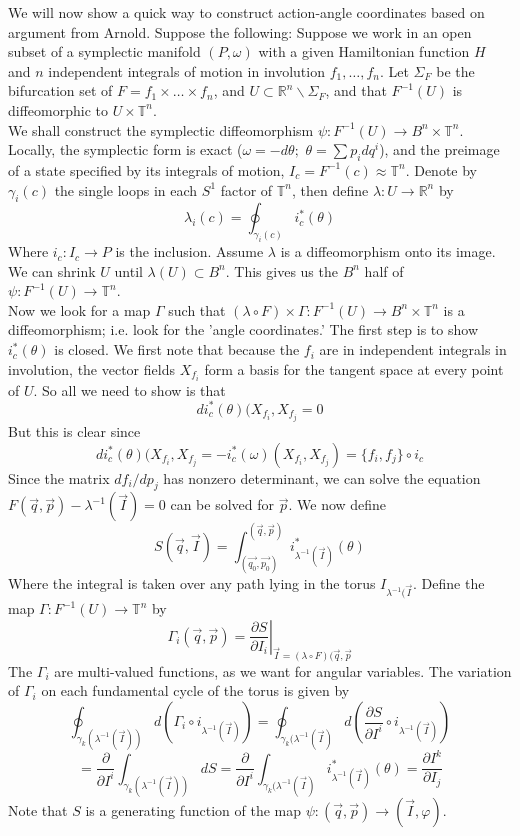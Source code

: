 \indent We will now show a quick way to construct action-angle coordinates based on argument from Arnold. Suppose the following: Suppose we work in an open subset of a symplectic manifold $(P,\omega)$ with a given Hamiltonian function $H$ and $n$ independent integrals of motion in involution $f_1, \ldots, f_n$. Let $\Sigma_F$ be the bifurcation set of $F= f_1 \times \ldots \times f_n$, and $U \subset \mathbb{R}^n \backslash \Sigma_F$, and that $F^{-1}(U)$ is diffeomorphic to $U \times \mathbb{T}^n$.\\
\indent We shall construct the symplectic diffeomorphism $\psi: F^{-1}(U) \to B^n \times \mathbb{T}^n$. Locally, the symplectic form is exact ($\omega = - d \theta; \hspace{4pt} \theta = \sum p_i dq^i$), and the preimage of a state specified by its integrals of motion, $I_c = F^{-1}(c) \approx \mathbb{T}^n$. Denote by $\gamma_i(c)$ the single loops in each $S^1$ factor of $\mathbb{T}^n$, then define $\lambda: U \to \mathbb{R}^n$ by 
\[ \lambda_i(c) = \oint_{\gamma_i(c)} i_c^*(\theta)  \]
\indent Where $i_c: I_c \to P$ is the inclusion. Assume $\lambda$ is a diffeomorphism onto its image. We can shrink $U$ until $\lambda(U) \subset B^n$. This gives us the $B^n$ half of $\psi: F^{-1}(U) \to \mathbb{T}^n$.\\
\indent Now we look for a map $\Gamma$ such that $(\lambda \circ F) \times \Gamma: F^{-1}(U) \to B^n \times \mathbb{T}^n$ is a diffeomorphism; i.e. look for the 'angle coordinates.' The first step is to show $i^*_c(\theta)$ is closed. We first note that because the $f_i$ are in independent integrals in involution, the vector fields $X_{f_i}$ form a basis for the tangent space at every point of $U$. So all we need to show is that
\[ di^*_c(\theta) (X_{f_i}, X_{f_j} =0 \]
But this is clear since
\[ di^*_c(\theta)(X_{f_i},X_{f_j} = -i^*_c(\omega)(X_{f_i},X_{f_j}) = \{f_i,f_j\}\circ i_c \]
Since the matrix $df_i/dp_j$ has nonzero determinant, we can solve the equation $F(\vec{q},\vec{p})-\lambda^{-1}(\vec{I})=0$ can be solved for $\vec{p}$. We now define
\[ S(\vec{q},\vec{I}) = \int_{(\vec{q_0},\vec{p_0})}^{(\vec{q},\vec{p})} i^*_{\lambda^{-1}(\vec{I})}(\theta)  \]
Where the integral is taken over any path lying in the torus $I_{\lambda^{-1}(\vec{I}}$. Define the map $\Gamma: F^{-1}(U) \to \mathbb{T}^n$ by 
\[ \Gamma_i(\vec{q},\vec{p}) = \left. \frac{\partial S}{\partial I_i}\right|_{\vec{I}=(\lambda \circ F)(\vec{q},\vec{p}}  \]
The $\Gamma_i$ are multi-valued functions, as we want for angular variables. The variation of $\Gamma_i$ on each fundamental cycle of the torus is given by
\[\oint_{\gamma_k(\lambda^{-1}(\vec{I}))}d(\Gamma_i \circ i_{\lambda^{-1}(\vec{I})})=\oint_{\gamma_k(\lambda^{-1}(\vec{I})} d \left( \frac{\partial S}{\partial I^i} \circ i_{\lambda^{-1}(\vec{I})} \right)\]
\[= \frac{\partial}{\partial I^i} \int_{\gamma_k(\lambda^{-1}(\vec{I}))}dS = \frac{\partial}{\partial I^i} \int_{\gamma_k(\lambda^{-1}(\vec{I})} i^*_{\lambda^{-1}(\vec{I})} (\theta) = \frac{\partial I^k}{\partial I_j}\] 
Note that $S$ is a generating function of the map $\psi: (\vec{q},\vec{p}) \to (\vec{I}, \varphi)$.


